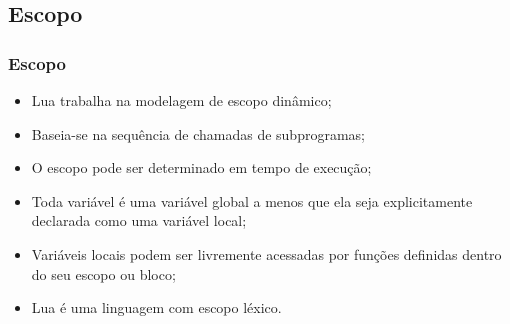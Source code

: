﻿\documentclass{beamer}
\begin{document}
\subsection{Escopo}
\begin{frame}[fragile]
\frametitle{Escopo}
	\begin{itemize}
	\item<1-> Lua trabalha na modelagem de escopo dinâmico; 
	\item<2-> Baseia-se na sequência de chamadas de subprogramas;
	\item<3-> O escopo pode ser determinado em tempo de execução;
	\item<4-> Toda variável é uma variável global a menos que ela seja explicitamente declarada como uma variável local;
	\item<5-> Variáveis locais podem ser livremente acessadas por funções definidas dentro do seu escopo ou bloco;
	\item<6-> Lua é uma linguagem com escopo léxico.
	\end{itemize}
\end{frame}
\end{document}
